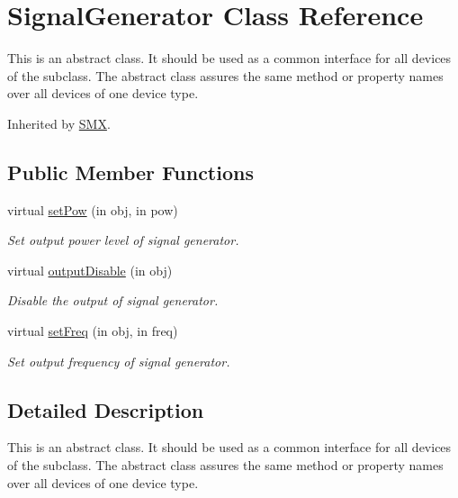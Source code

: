 \hypertarget{class_signal_generator}{}\section{Signal\+Generator Class Reference}
\label{class_signal_generator}


This is an abstract class. It should be used as a common interface for all devices of the subclass. The abstract class assures the same method or property names over all devices of one device type.  




Inherited by \hyperlink{class_s_m_x}{S\+MX}.

\subsection*{Public Member Functions}
\begin{DoxyCompactItemize}
\item 
virtual \hyperlink{class_signal_generator_a23eeb0ad1a1a5d4ed06255e4161a9d1e}{set\+Pow} (in obj, in pow)
\begin{DoxyCompactList}\small\item\em Set output power level of signal generator. \end{DoxyCompactList}\item 
virtual \hyperlink{class_signal_generator_a537e05b408855d7fbba8f38409be37df}{output\+Disable} (in obj)
\begin{DoxyCompactList}\small\item\em Disable the output of signal generator. \end{DoxyCompactList}\item 
virtual \hyperlink{class_signal_generator_a0ac40e204a22be1bf7bdd65f584c2bb4}{set\+Freq} (in obj, in freq)
\begin{DoxyCompactList}\small\item\em Set output frequency of signal generator. \end{DoxyCompactList}\end{DoxyCompactItemize}


\subsection{Detailed Description}
This is an abstract class. It should be used as a common interface for all devices of the subclass. The abstract class assures the same method or property names over all devices of one device type. 

